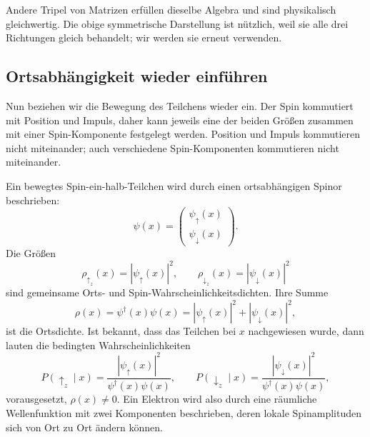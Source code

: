 \begin{classroomqa}
\end{classroomqa}

Andere Tripel von Matrizen erfüllen dieselbe Algebra und sind physikalisch gleichwertig. Die obige symmetrische Darstellung ist nützlich, weil sie alle drei Richtungen gleich behandelt; wir werden sie erneut verwenden.

\subsection{Ortsabhängigkeit wieder einführen}

Nun beziehen wir die Bewegung des Teilchens wieder ein. Der Spin kommutiert mit Position und Impuls, daher kann jeweils eine der beiden Größen zusammen mit einer Spin-Komponente festgelegt werden. Position und Impuls kommutieren nicht miteinander; auch verschiedene Spin-Komponenten kommutieren nicht miteinander.

Ein bewegtes Spin-ein-halb-Teilchen wird durch einen ortsabhängigen Spinor beschrieben:
\begin{equation}
\psi(x)=
\begin{pmatrix}
\psi_\uparrow(x)\\
\psi_\downarrow(x)
\end{pmatrix}.
\end{equation}
Die Größen
\begin{equation}
\rho_{\uparrow_z}(x)=|\psi_\uparrow(x)|^2,
\qquad
\rho_{\downarrow_z}(x)=|\psi_\downarrow(x)|^2
\end{equation}
sind gemeinsame Orts- und Spin-Wahrscheinlichkeitsdichten. Ihre Summe
\begin{equation}
\rho(x)=\psi^\dagger(x)\psi(x)
=|\psi_\uparrow(x)|^2+|\psi_\downarrow(x)|^2,
\end{equation}
ist die Ortsdichte. Ist bekannt, dass das Teilchen bei \(x\) nachgewiesen wurde, dann lauten die bedingten Wahrscheinlichkeiten
\begin{equation}
P(\uparrow_z\mid x)
=
\frac{|\psi_\uparrow(x)|^2}{\psi^\dagger(x)\psi(x)},
\qquad
P(\downarrow_z\mid x)
=
\frac{|\psi_\downarrow(x)|^2}{\psi^\dagger(x)\psi(x)},
\end{equation}
vorausgesetzt, \(\rho(x)\neq0\). Ein Elektron wird also durch eine räumliche Wellenfunktion mit zwei Komponenten beschrieben, deren lokale Spinamplituden sich von Ort zu Ort ändern können.

